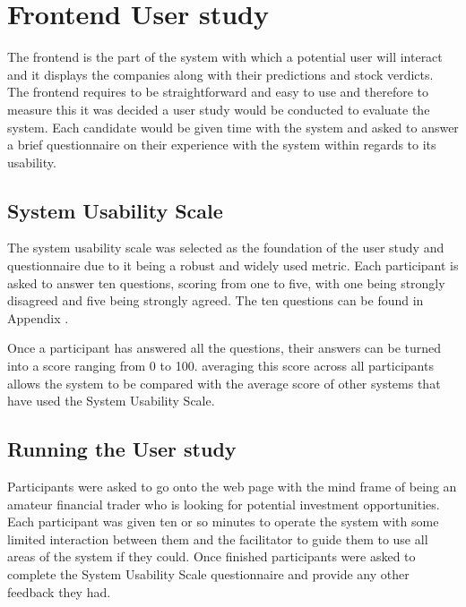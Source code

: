     
    
    
    
    
    
    \section{Frontend User study}
    \label{eval:user_study}
    The frontend is the part of the system with which a potential user will interact and it displays the companies along with their predictions and stock verdicts. The frontend requires to be straightforward and easy to use and therefore to measure this it was decided a user study would be conducted to evaluate the system. Each candidate would be given time with the system and asked to answer a brief questionnaire on their experience with the system within regards to its usability. 
        
        \subsection{System Usability Scale}
        The system usability scale \citep{website:SUS} was selected as the foundation of the user study and questionnaire due to it being a robust and widely used metric. Each participant is asked to answer ten questions, scoring from one to five, with one being strongly disagreed and five being strongly agreed. The ten questions can be found in Appendix \cite{Ap:SUS}.
        
        Once a participant has answered all the questions, their answers can be turned into a score ranging from 0 to 100. averaging this score across all participants allows the system to be compared with the average score of other systems that have used the System Usability Scale.
            
        \subsection{Running the User study}
        Participants were asked to go onto the web page with the mind frame of being an amateur financial trader who is looking for potential investment opportunities. Each participant was given ten or so minutes to operate the system with some limited interaction between them and the facilitator to guide them to use all areas of the system if they could. Once finished participants were asked to complete the System Usability Scale questionnaire and provide any other feedback they had.
            
